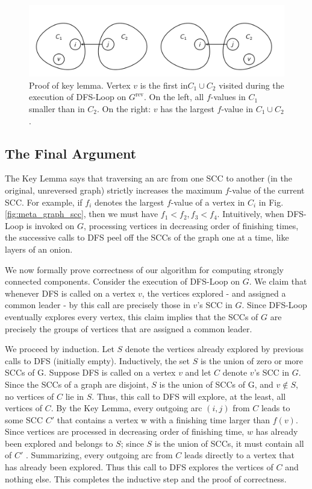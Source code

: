 \documentclass [12pt]{article}
\theoremstyle{definition}
\begin{document}
\begin{figure}
\includegraphics[scale=0.8]{scc_proof.png}
\caption{Proof of key lemma. Vertex $v$ is the first in$ C_1 \cup C_2$ visited during the execution of DFS-Loop on $G^{\text{rev}}$. On the left, all $f$-values in $C_1$ smaller than in $C_2$. On the right: $v$ has the largest $f$-value in $C_1 \cup C_2$.}
\label{fig:scc_proof}
\end{figure}

\subsection{The Final Argument} 

The Key Lemma says that traversing an arc from one SCC to another (in the original, unreversed graph) strictly increases the maximum $f$-value of the current SCC. For example, if $f_i$ denotes the largest $f$-value of a vertex in $C_i$ in Fig. \ref{fig:meta_graph_scc}, then we must have $f_1 < f_2, f_3 < f_4$. Intuitively, when DFS-Loop is invoked on $G$, processing vertices in decreasing order of finishing times, the successive calls to DFS peel off the SCCs of the graph one at a time, like layers of an onion. 

We now formally prove correctness of our algorithm for computing strongly connected components. Consider the execution of DFS-Loop on $G$. We claim that whenever DFS is called on a vertex $v$, the vertices explored - and assigned a common leader - by this call are precisely those in $v$'s SCC in $G$. Since DFS-Loop eventually explores every vertex, this claim implies that the SCCs of $G$ are precisely the groups of vertices that are assigned a common leader. 

We proceed by induction. Let $S$ denote the vertices already explored by previous calls to DFS (initially empty). Inductively, the set $S$ is the union of zero or more SCCs of G. Suppose DFS is called on a vertex $v$ and let $C$ denote $v$'s SCC in $G$. Since the SCCs of a graph are disjoint, $S$ is the union of SCCs of G, and $v \notin S$, no vertices of $C$ lie in $S$. Thus, this call to DFS will explore, at the least, all vertices of $C$. By the Key Lemma, every outgoing arc $(i, j)$ from $C$ leads to some SCC $C'$ that contains a vertex w with a finishing time larger than $f (v)$. Since vertices are processed in decreasing order of finishing time, $w$ has already been explored and belongs to $S$; since $S$ is the union of SCCs, it must contain all of $C'$ . Summarizing, every outgoing arc from $C$ leads directly to a vertex that has already been explored. Thus this call to DFS explores the vertices of $C$ and nothing else. This completes the inductive step and
the proof of correctness.
\end{document}
